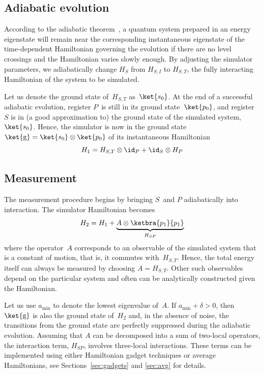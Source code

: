 \documentclass[11pt,oneside,final]{huthesis}%
\begin{document}
\subsection{Adiabatic evolution}
According to the adiabatic theorem~\cite{Messiah99},
a quantum system prepared in an energy eigenstate will remain near 
the corresponding instantaneous eigenstate of the time-dependent
Hamiltonian governing the evolution if there are no level crossings
and the Hamiltonian varies slowly enough.
By adjusting the simulator parameters, we adiabatically change
$H_S$ from $H_{S,I}$ to $H_{S,T}$, the fully interacting Hamiltonian of the
system to be
simulated.

Let us denote the ground state of~$H_{S,T}$ as~$\ket{s_{0}}$. 
At the end of a successful adiabatic evolution, register $P$~is still in its ground
state~$\ket{p_0}$, 
and  register $S$ is in (a good approximation to) the ground state of the simulated
system, $\ket{s_0}$. Hence, the simulator is now in the ground state
$\ket{\text{g}} = \ket{s_0}\otimes\ket{p_0}$
of its instantaneous Hamiltonian
\begin{equation}
H_1 = H_{S,T} \otimes \id_P + \id_S \otimes H_P
\end{equation}




\subsection{Measurement}
The measurement procedure begins by bringing $S$~and $P$ adiabatically
into interaction.
The simulator Hamiltonian becomes
\begin{equation}
H_2 = H_1 + \underbrace{A \otimes \ketbra{p_1}{p_1}}_{H_{SP}}
\end{equation}
where the operator~$A$ corresponds to an observable of the simulated system
that is a constant of motion, that is, it commutes with~$H_{S,T}$.
Hence, the total energy itself can always be measured by choosing
$A = H_{S,T}$.
Other such observables depend on the particular system and
often can be analytically constructed given the Hamiltonian.

Let us use $a_{\text{min}}$ to denote the lowest eigenvalue of~$A$.
If $a_{\text{min}} +\delta > 0$,
then $\ket{\text{g}}$ is also the ground state of~$H_2$
and, in the absence of noise, the transitions from the ground state are
perfectly suppressed during the adiabatic evolution.
Assuming that $A$ can be decomposed into a sum of
two-local operators, the interaction term, $H_{SP}$, involves
three-local interactions. These terms can be implemented using either
Hamiltonian gadget techniques or average Hamiltonians, see 
Sections~\ref{sec:gadgets} and \ref{sec:avg} for details.
\end{document}
